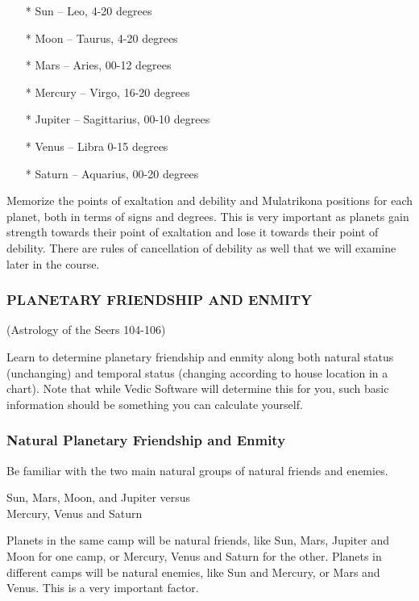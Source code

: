 

\begin{enumerate}
\item[*] Sun – Leo, 4-20 degrees
\item[*] Moon – Taurus, 4-20 degrees
\item[*] Mars – Aries, 00-12 degrees
\item[*] Mercury – Virgo, 16-20 degrees
\item[*] Jupiter – Sagittarius, 00-10 degrees
\item[*] Venus – Libra 0-15 degrees
\item[*] Saturn – Aquarius, 00-20 degrees
  \end{enumerate}

Memorize the points of exaltation and debility and Mulatrikona positions for each planet, both in terms of signs and degrees. This is very important as planets gain strength towards their point of exaltation and lose it towards their point of debility. There are rules of cancellation of debility as well that we will examine later in the course.

 

\subsubsection{PLANETARY FRIENDSHIP AND ENMITY }(Astrology of the Seers 104-106)
 

Learn to determine planetary friendship and enmity along both natural status (unchanging) and temporal status (changing according to house location in a chart). Note that while Vedic Software will determine this for you, such basic information should be something you can calculate yourself.

 

\subsubsection{Natural Planetary Friendship and Enmity}

 

Be familiar with the two main natural groups of natural friends and enemies.

Sun, Mars, Moon, and Jupiter versus \\
Mercury, Venus and Saturn
 

Planets in the same camp will be natural friends, like Sun, Mars, Jupiter and Moon for one camp, or Mercury, Venus and Saturn for the other. Planets in different camps will be natural enemies, like Sun and Mercury, or Mars and Venus. This is a very important factor.

